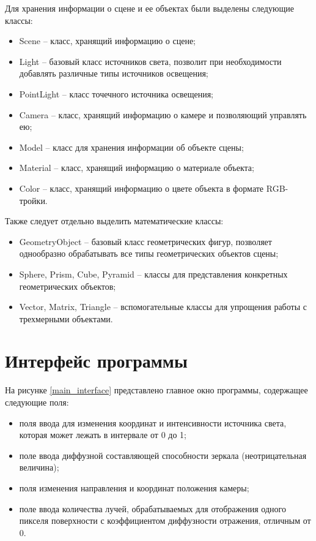 Для хранения информации о сцене и ее объектах были выделены следующие классы:
\begin{itemize}
	\item Scene -- класс, хранящий информацию о сцене;
	\item Light -- базовый класс источников света, позволит при необходимости добавлять различные типы источников освещения;
	\item PointLight -- класс точечного источника освещения;
	\item Camera -- класс, хранящий информацию о камере и позволяющий управлять ею;
	\item Model -- класс для хранения информации об объекте сцены;
	\item Material -- класс, хранящий информацию о материале объекта;
	\item Color -- класс, хранящий информацию о цвете объекта в формате RGB-тройки.
\end{itemize}

Также следует отдельно выделить математические классы:
\begin{itemize}
	\item GeometryObject -- базовый класс геометрических фигур, позволяет однообразно обрабатывать все типы геометрических объектов сцены;
	\item Sphere, Prism, Cube, Pyramid -- классы для представления конкретных геометрических объектов;
	\item Vector, Matrix, Triangle -- вспомогательные классы для упрощения работы с трехмерными объектами.
\end{itemize}

\section{Интерфейс программы}

На рисунке \ref{main_interface} представлено главное окно программы, содержащее следующие поля:
\begin{itemize}
	\item поля ввода для изменения координат и интенсивности источника света, которая может лежать в интервале от 0 до 1;
	\item поле ввода диффузной составляющей способности зеркала (неотрицательная величина);
	\item поля изменения направления и координат положения камеры;
	\item поле ввода количества лучей, обрабатываемых для отображения одного пикселя поверхности с коэффициентом диффузности отражения, отличным от 0.
\end{itemize}

